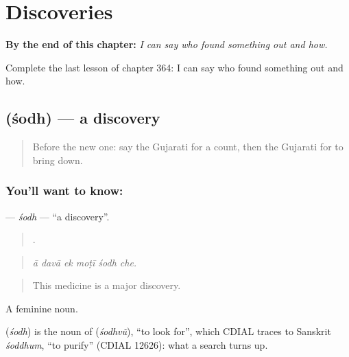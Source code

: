 
\chapter{Discoveries}
\label{ch:gu-discoveries}

\begin{chapteropening}
\textbf{By the end of this chapter:} \emph{I can say who found something out and how.}

Complete the last lesson of chapter 364: I can say who found something out and how.
\end{chapteropening}

\section[\texorpdfstring{\gu{શોધ} (śodh)}{શોધ (śodh)}]{ (śodh) — a discovery}

\label{lesson:GU-C364-sodh}



\begin{quote}
Before the new one: say the Gujarati for a count, then the Gujarati for to bring down.
\end{quote}

\subsection*{You'll want to know: }
\textbf{} — \emph{śodh} — \textquotedblleft{}a discovery\textquotedblright{}.

\begin{quote}
     .
\end{quote}

\begin{quote}
\emph{ā davā ek moṭī śodh che.}
\end{quote}

\begin{quote}
This medicine is a major discovery.
\end{quote}

A feminine noun.

\begin{cousinweb}
\textbf{} (\emph{śodh}) is the noun of \textbf{} (\emph{śodhvũ}), \textquotedblleft{}to look for\textquotedblright{}, which CDIAL traces to Sanskrit \emph{śoddhum}, \textquotedblleft{}to purify\textquotedblright{} (CDIAL 12626): what a search turns up.
\end{cousinweb}

